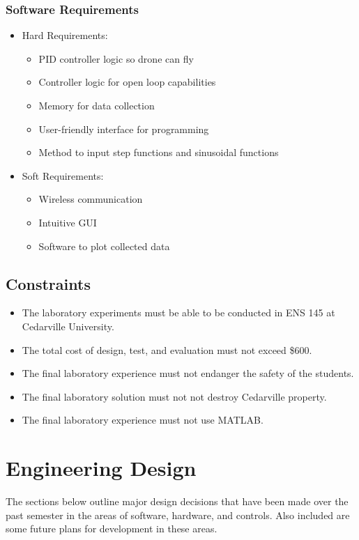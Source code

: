 \documentclass[12pt, titlepage]{article}
\begin{document}
\subsubsection{Software Requirements}
\begin{itemize}
  \item Hard Requirements:
  \begin{itemize}
    \item PID controller logic so drone can fly
    \item Controller logic for open loop capabilities
    \item Memory for data collection
    \item User-friendly interface for programming
    \item Method to input step functions and sinusoidal functions
  \end{itemize}
  \item Soft Requirements:
  \begin{itemize}
    \item Wireless communication
    \item Intuitive GUI
    \item Software to plot collected data
  \end{itemize}
\end{itemize}
\subsection{Constraints}
\begin{itemize}
  \item The laboratory experiments must be able to be conducted in ENS 145 at Cedarville University.
  \item The total cost of design, test, and evaluation must not exceed \$600.
  \item The final laboratory experience must not endanger the safety of the students.
  \item The final laboratory solution must not not destroy Cedarville property.
  \item The final laboratory experience must not use MATLAB.
\end{itemize}

\section{Engineering Design}
The sections below outline major design decisions that have been made over the past semester in the areas of software, hardware, and controls. Also included are some future plans for development in these areas.
\end{document}
